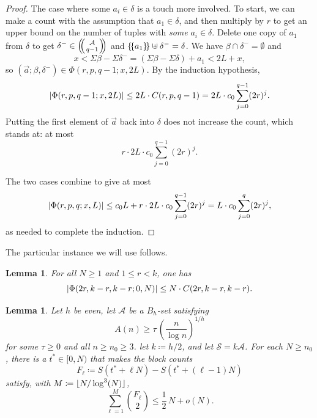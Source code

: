 \documentclass[10pt,letterpaper]{article}
\newcommand{\cA}{\mathcal{A}}
\newcommand{\cS}{\mathcal{S}}
\DeclarePairedDelimiter{\abs}{\lvert}{\rvert}
\DeclarePairedDelimiter{\floor}{\lfloor}{\rfloor}
\DeclarePairedDelimiter{\multi}{\{\!\{}{\}\!\}}
\newcommand{\multibinom}[2]{\left(\kern-0.3em\left(\genfrac{}{}{0pt}{}{#1}{#2}\right)\kern-0.3em\right)}
\newtheorem{lem}[thm]{Lemma}
\theoremstyle{remark}
\begin{document}
\begin{proof}
The case where some $a_i\in\delta$ is a touch more involved. To start, we can make a count with the assumption that $a_1\in \delta$, and then multiply by $r$ to get an upper bound on the number of tuples with \emph{some} $a_i\in\delta$. Delete one copy of $a_1$ from $\delta$ to get $\delta^- \in \multibinom{\cA}{q-1}$ and $\multi{a_1}\uplus \delta^- = \delta$. We have $\beta \cap \delta^-=\emptyset$ and
  \[x < \Sigma\beta-\Sigma\delta^- = (\Sigma\beta-\Sigma\delta)+a_1 < 2L+x,\] 
so $(\vec a; \beta, \delta^-) \in \Phi(r ,p,q-1;x,2L)$. 
By the induction hypothesis,
  \[\abs*{\Phi(r ,p,q-1;x,2L)} \le 2L \cdot C(r,p,q-1)
  = 2L \cdot c_0\sum_{j=0}^{q-1} (2r )^j.\]
Putting the first element of $\vec a$ back into $\delta$ does not increase the count, which stands at: at most
  \[ r  \cdot 2L \cdot c_0 \sum_{j=0}^{q-1} (2r )^j.\]

The two cases combine to give at most
  \[\abs*{\Phi(r ,p,q;x,L)} \le c_0L + r \cdot 2L \cdot c_0\sum_{j=0}^{q-1} (2r )^j 
    = L \cdot c_0 \sum_{j=0}^{q} (2r )^j,\]
as needed to complete the induction.
\end{proof}

The particular instance we will use follows.
\begin{lem}\label{lem:Jia in action}
For all $N\ge 1$ and $1\le r <k$, one has
  \[\abs*{\Phi(2r,k-r,k-r;0,N)} \le N \cdot C(2r,k-r,k-r).\]
\end{lem}

\begin{lem}\label{lem:sumset energy bound}
Let $h$ be even, let $\cA$ be a $B_h$-set satisfying 
  \begin{equation}\label{eq:tau appears}
    A(n) \ge \tau \, \left(\frac{n}{\log n}\right)^{1/h}
  \end{equation}
for some $\tau\ge 0$ and all $n\ge n_0\ge 3$. let $k \coloneqq h/2$, and let $\cS=k\cA$. For each $N\ge n_0$, there is a $t^\ast\in [0,N)$ that makes the block counts 
  \[F_\ell\coloneqq S(t^\ast+\ell N) - S(t^\ast+(\ell-1)N)\]
satisfy, with $M\coloneqq \floor{N/\log^3(N)}$,
  \[   \sum_{\ell=1}^{M}\binom{F_\ell}{2} \le \frac{1}{2}\,N + o(N).\]
\end{lem}
\end{document}
